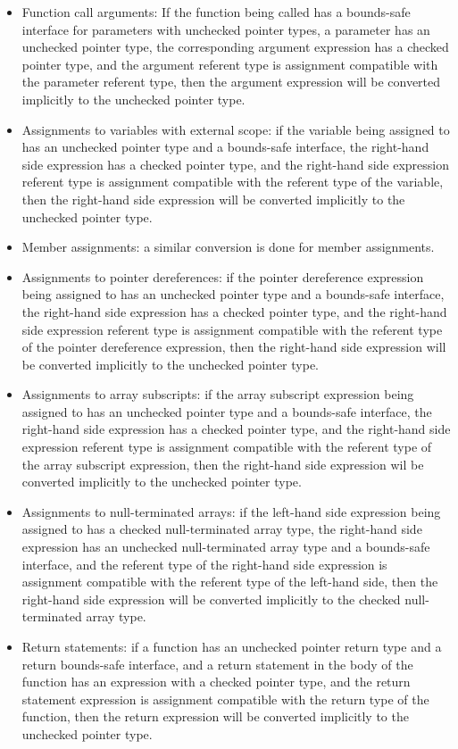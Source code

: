 \begin{itemize}
\item Function call arguments: If the function being called has a
      bounds-safe interface for parameters with unchecked pointer types, a parameter
      has an unchecked pointer type, the corresponding argument expression
      has a checked pointer type, and the argument referent type is assignment
      compatible with the parameter referent type, then the argument expression
      will be converted implicitly to the unchecked pointer type.
\item Assignments to variables with external scope: if the variable being
     assigned to has an unchecked pointer type and a bounds-safe interface, the
     right-hand side expression has a checked pointer type, and the right-hand
     side expression referent type is assignment compatible with the referent
     type of the variable, then the right-hand side expression will be converted
     implicitly to the unchecked pointer type.
\item
    Member assignments: a similar conversion is done for member assignments.
\item Assignments to pointer dereferences: if the pointer dereference expression
  being assigned to has an unchecked pointer type and a bounds-safe interface, the
  right-hand side expression has a checked pointer type, and the right-hand side
  expression referent type is assignment compatible with the referent type of the
  pointer dereference expression, then the right-hand side expression will be
  converted implicitly to the unchecked pointer type.
\item Assignments to array subscripts: if the array subscript expression being
  assigned to has an unchecked pointer type and a bounds-safe interface, the
  right-hand side expression has a checked pointer type, and the right-hand
  side expression referent type is assignment compatible with the referent
  type of the array subscript expression, then the right-hand side expression
  wil be converted implicitly to the unchecked pointer type.
\item Assignments to null-terminated arrays: if the left-hand side expression
  being assigned to has a checked null-terminated array type, the right-hand side
  expression has an unchecked null-terminated array type and a bounds-safe interface,
  and the referent type of the right-hand side expression is assignment compatible
  with the referent type of the left-hand side, then the right-hand side expression
  will be converted implicitly to the checked null-terminated array type.
\item Return statements: if a function has an unchecked pointer return type and a
  return bounds-safe interface, and a return statement in the body of the function
  has an expression with a checked pointer type, and the return statement expression is
  assignment compatible with the return type of the function, then the return expression
  will be converted implicitly to the unchecked pointer type.
\end{itemize}

